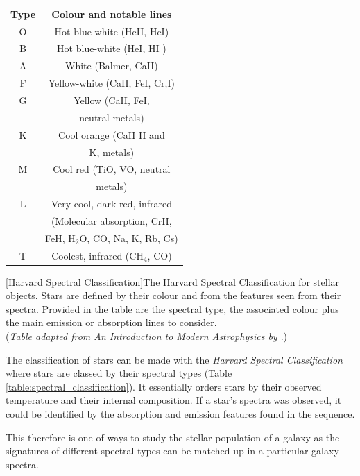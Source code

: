 \documentclass[12pt, twocolumn]{revtex4}    %
\begin{document}
\begin{center}
\begin{tabular}{c@{\hskip 20pt}c} 
 \hline
 \textbf{Type} & \textbf{Colour and notable lines} \\ [0.5ex] 
 O & Hot blue-white (HeII, HeI) \\
 B & Hot blue-white (HeI, HI ) \\
 A & White (Balmer, CaII) \\
 F & Yellow-white (CaII, FeI, Cr,I) \\
 G & Yellow (CaII, FeI,  \\
  & neutral metals) \\
 K & Cool orange (CaII H and \\ 
  & K, metals) \\
 M & Cool red (TiO, VO, neutral \\
  & metals) \\
 L & Very cool, dark red, infrared \\
  & (Molecular absorption, CrH, \\
  & FeH, H$_2$O, CO, Na, K, Rb, Cs) \\
 T & Coolest, infrared (CH$_4$, CO) \\
 \hline
\end{tabular}
[Harvard Spectral Classification]{The Harvard Spectral Classification for stellar objects. Stars are defined by their colour and from the features seen from their spectra. Provided in the table are the spectral type, the associated colour plus the main emission or absorption lines to consider. \\
(\textit{Table adapted from An Introduction to Modern Astrophysics by \cite{carroll_astro}}.)}
\label{table:spectral_classification}
\end{center}


The classification of stars can be made with the \textit{Harvard Spectral Classification} where stars are classed by their spectral types (Table \ref{table:spectral_classification}). It essentially orders stars by their observed temperature and their internal composition. If a star's spectra was observed, it could be identified by the absorption and emission features found in the sequence.   

This therefore is one of ways to study the stellar population of a galaxy as the signatures of different spectral types can be matched up in a particular galaxy spectra. 
\end{document}
